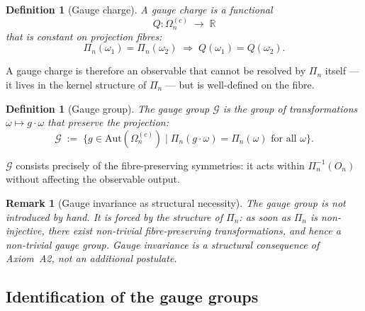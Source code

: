 \documentclass[11pt,a4paper]{article}
\newtheorem{definition}[theorem]{Definition}
\newtheorem{remark}[theorem]{Remark}
\begin{document}
      \begin{definition}[Gauge charge]
        \label{def:gauge-charge}
        A \emph{gauge charge} is a functional
        \begin{equation}
          Q : \Omega_n^{(c)} \;\longrightarrow\; \mathbb{R}
        \end{equation}
        that is constant on projection fibres:
        \begin{equation}
          \Pi_n(\omega_1) = \Pi_n(\omega_2)
          \;\Longrightarrow\;
          Q(\omega_1) = Q(\omega_2).
        \end{equation}
      \end{definition}

      A gauge charge is therefore an observable that cannot be resolved by $\Pi_n$
      itself — it lives in the kernel structure of $\Pi_n$ — but is well-defined on
      the fibre.

      \begin{definition}[Gauge group]
        \label{def:gauge-group}
        The \emph{gauge group} $\mathcal{G}$ is the group of transformations
        $\omega \mapsto g \cdot \omega$ that preserve the projection:
        \begin{equation}
          \mathcal{G}
          \;:=\;
          \bigl\{g \in \mathrm{Aut}(\Omega_n^{(c)}) \mid \Pi_n(g \cdot \omega) = \Pi_n(\omega)
          \text{ for all } \omega \bigr\}.
        \end{equation}
      \end{definition}

      $\mathcal{G}$ consists precisely of the fibre-preserving symmetries: it acts
      within $\Pi_n^{-1}(O_n)$ without affecting the observable output.

      \begin{remark}[Gauge invariance as structural necessity]
        The gauge group is not introduced by hand.
        It is forced by the structure of $\Pi_n$: as soon as $\Pi_n$ is non-injective,
        there exist non-trivial fibre-preserving transformations, and hence a
        non-trivial gauge group.
        Gauge invariance is a structural consequence of Axiom~A2, not an additional
        postulate.
      \end{remark}

    \subsection{Identification of the gauge groups}
\end{document}

